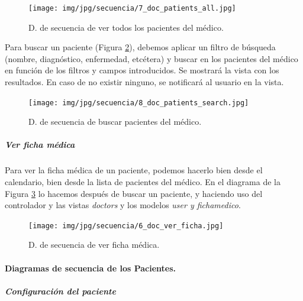 \documentclass[a4paper,oneside,11pt]{book}
\begin{document}
					\begin{figure}[H]
					  \centering
					    \texttt{[image: img/jpg/secuencia/7\_doc\_patients\_all.jpg]}
					  \caption{D. de secuencia de ver todos los pacientes del médico.}
					  \label{fig:cont_doc_patients}
					\end{figure} 
					
					Para buscar un paciente (Figura \ref{fig:cont_doc_patient_search}), debemos aplicar un filtro de búsqueda (nombre, diagnóstico, enfermedad, etcétera) y buscar en los pacientes del médico en función de los filtros y campos introducidos. Se mostrará la vista con los resultados. En caso de no existir ninguno, se notificará al usuario en la vista.
					
					\begin{figure}[H]
					  \centering
					    \texttt{[image: img/jpg/secuencia/8\_doc\_patients\_search.jpg]}
					  \caption{D. de secuencia de buscar pacientes del médico.}
					  \label{fig:cont_doc_patient_search}
					\end{figure}
				
				
				\subparagraph{Ver ficha médica} %
				\label{subp:cont_ver_ficha_medica}
					
						Para ver la ficha médica de un paciente, podemos hacerlo bien desde el calendario, bien desde la lista de pacientes del médico. En el diagrama de la Figura \ref{fig:cont_doc_ficha} lo hacemos después de buscar un paciente, y haciendo uso del controlador y las vistas \textit{doctors} y los modelos \textit{user y fichamedico}.
						
						\begin{figure}[H]
						  \centering
						    \texttt{[image: img/jpg/secuencia/6\_doc\_ver\_ficha.jpg]}
						  \caption{D. de secuencia de ver ficha médica.}
						  \label{fig:cont_doc_ficha}
						\end{figure}
				

			
			\paragraph{Diagramas de secuencia de los Pacientes.} %
			\label{par:diagramas_de_secuencia_de_los_pacientes_}
			
				\subparagraph{Configuración del paciente} %
				\label{subp:cont_configuracion_paciente}
				
\end{document}
